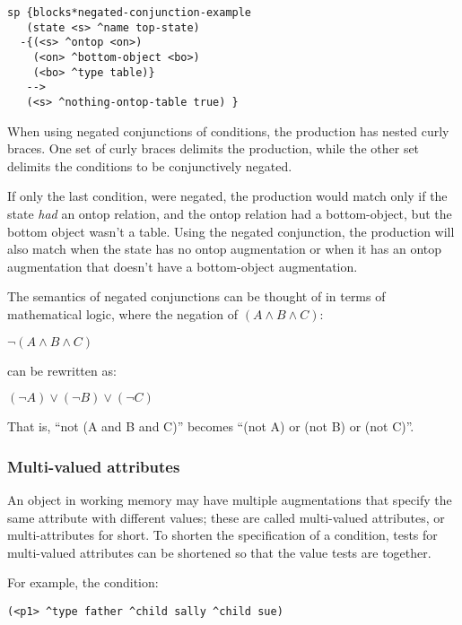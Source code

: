 \begin{verbatim}
sp {blocks*negated-conjunction-example
   (state <s> ^name top-state)
  -{(<s> ^ontop <on>)
    (<on> ^bottom-object <bo>)
    (<bo> ^type table)}
   -->
   (<s> ^nothing-ontop-table true) } 
\end{verbatim}

When using negated conjunctions of conditions, the production has nested curly braces. One set of curly braces delimits the production, while the other set delimits the conditions to be conjunctively negated.

If only the last condition,  were negated, the production would match only if the state \emph{had} an ontop relation, and the ontop relation had a bottom-object, but the bottom object wasn't a table. Using the negated conjunction, the production will also match when the state has no ontop augmentation or when it has an ontop augmentation that doesn't have a bottom-object augmentation.

The semantics of negated conjunctions can be thought of in terms of mathematical logic, where the negation of $(A \wedge B \wedge C)$:

$\neg (A \wedge B \wedge C)$

can be rewritten as:

$(\neg A) \vee (\neg B) \vee (\neg C)$

That is, ``not (A and B and C)'' becomes ``(not A) or (not B) or (not C)''.



\subsubsection{Multi-valued attributes}
\label{SYNTAX-pm-lhs-multi}

An object in working memory may have multiple augmentations that specify the same attribute with different values; these are called multi-valued attributes, or multi-attributes for short.  To shorten the specification of a condition, tests for multi-valued attributes can be shortened so that the value tests are together.

For example, the condition:

\begin{verbatim}
(<p1> ^type father ^child sally ^child sue)
\end{verbatim}

